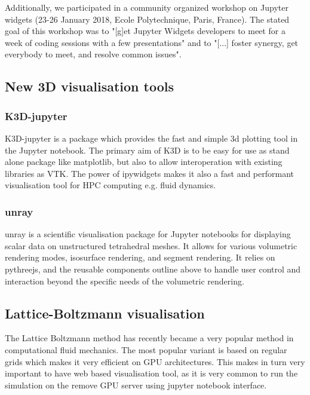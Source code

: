 \documentclass{deliverablereport}
\begin{document}
Additionally, we participated in a community organized workshop on Jupyter widgets (23-26 January 2018, Ecole Polytechnique, Paris, France). The stated goal of this workshop was to "[g]et Jupyter Widgets developers to meet for a week of coding sessions with a few presentations" and to "[...] foster synergy, get everybody to meet, and resolve common issues".


\subsection{New 3D visualisation tools}\label{new-3d}


\subsubsection{K3D-jupyter}

K3D-jupyter is a package which provides the fast and simple 3d
plotting tool in the Jupyter notebook. The primary aim of K3D is to be
easy for use as stand alone package like matplotlib, but also to
allow interoperation with existing libraries as VTK. The power of
ipywidgets makes it also a fast and performant visualisation tool for
HPC computing e.g. fluid dynamics.


\subsubsection{unray}

unray is a scientific visualisation package for Jupyter notebooks for displaying
scalar data on unstructured tetrahedral meshes. It allows for various volumetric
rendering modes, isosurface rendering, and segment rendering.
It relies on pythreejs, and the reusable components outline above to handle
user control and interaction beyond the specific needs of the volumetric
rendering.


\subsection{Lattice-Boltzmann visualisation}

The Lattice Boltzmann method has recently became a very popular method
in computational fluid mechanics. The most popular variant is based on
regular grids which makes it very efficient on GPU architectures. This
makes in turn very important to have web based visualisation tool, as
it is very common to run the simulation on the remove GPU server using
jupyter notebook interface.
\end{document}
